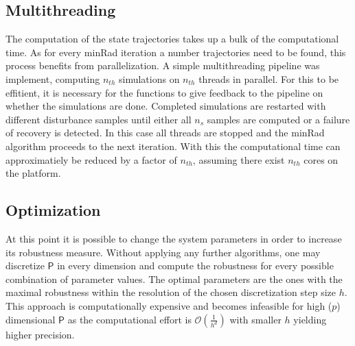     


\subsection{Multithreading} \label{mt}
    
    The computation of the state trajectories takes up a bulk of the computational time. As for every minRad iteration a number trajectories need to be found, this process benefits from parallelization. A simple multithreading pipeline was implement, computing $n_{th}$ simulations on $n_{th}$ threads in parallel. For this to be effitient, it is necessary for the functions to give feedback to the pipeline on whether the simulations are done. Completed simulations are restarted with different disturbance samples until either all $n_s$ samples are computed or a failure of recovery  is detected. In this case all threads are stopped and the minRad algorithm proceeds to the next iteration. 
    With this the computational time can approximatiely be reduced by a factor of $n_{th}$, assuming there exist $n_{th}$ cores on the platform. 

\subsection{Optimization} \label{opt}
    
    At this point it is possible to change the system parameters in order to increase its robustness measure.
    Without applying any further algorithms, one may discretize $\mathsf{P}$ in every dimension and compute the robustness for every possible combination of parameter values. The optimal parameters are the ones with the maximal robustness within the resolution of the chosen discretization step size $h$. This approach is computationally expensive and becomes infeasible for high ($p$) dimensional $\mathsf{P}$ as the computational effort is $\mathcal{O}(\frac{1}{h^d})$ with smaller $h$ yielding higher precision. 
    
